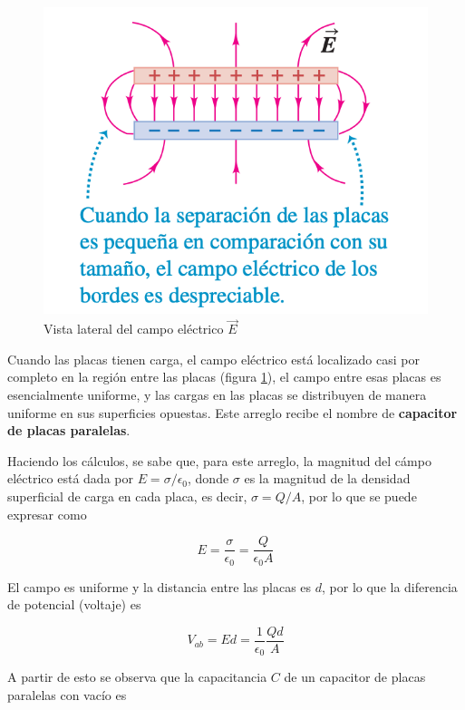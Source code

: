 \begin{figure}[t]
\centering
\includegraphics[scale=0.4]{fig/cap-placas-paralelas-2}
\caption{Vista lateral del campo eléctrico $\vec{E}$}
\label{fig:cap-2}
\end{figure}

Cuando las placas tienen carga, el campo eléctrico está localizado casi por completo en la región entre las placas (figura \ref{fig:cap-2}), el campo entre esas placas es esencialmente uniforme, y las cargas en las placas se distribuyen de manera uniforme en sus superficies opuestas. Este arreglo recibe el nombre de \textbf{capacitor de placas paralelas}.

Haciendo los cálculos, se sabe que, para este arreglo, la magnitud del cámpo eléctrico está dada por $E=\sigma/\epsilon_0$, donde $\sigma$ es la magnitud de la densidad superficial de carga en cada placa, es decir, $\sigma=Q/A$, por lo que se puede expresar como

\begin{equation*}
E=\frac{\sigma}{\epsilon_0}=\frac{Q}{\epsilon_0A}
\end{equation*}

El campo es uniforme y la distancia entre las placas es $d$, por lo que la diferencia de potencial (voltaje) es

\begin{equation*}
V_{ab}=Ed=\frac{1}{\epsilon_0}\frac{Qd}{A}
\end{equation*}

A partir de esto se observa que la capacitancia $C$ de un capacitor de placas paralelas con vacío es


